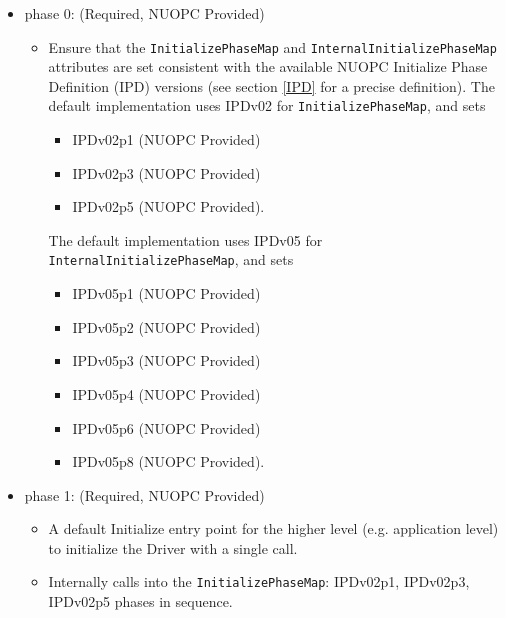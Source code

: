 \begin{itemize}
\item phase 0: ({\sc Required, NUOPC Provided})
  \begin{itemize}
  \item Ensure that the {\tt InitializePhaseMap} and {\tt InternalInitializePhaseMap} attributes are set consistent with the available NUOPC Initialize Phase Definition (IPD) versions (see section \ref{IPD} for a precise definition). The default implementation uses IPDv02 for {\tt InitializePhaseMap}, and sets
    \begin{itemize}
    \item IPDv02p1  ({\sc NUOPC Provided})
    \item IPDv02p3  ({\sc NUOPC Provided})
    \item IPDv02p5  ({\sc NUOPC Provided}).
    \end{itemize}  
 The default implementation uses IPDv05 for {\tt InternalInitializePhaseMap}, and sets
    \begin{itemize}
    \item IPDv05p1  ({\sc NUOPC Provided})
    \item IPDv05p2  ({\sc NUOPC Provided})
    \item IPDv05p3  ({\sc NUOPC Provided})
    \item IPDv05p4  ({\sc NUOPC Provided})
    \item IPDv05p6  ({\sc NUOPC Provided})
    \item IPDv05p8  ({\sc NUOPC Provided}).
    \end{itemize}    
  \end{itemize}  
\item phase 1: ({\sc Required, NUOPC Provided})
  \begin{itemize}
    \item A default Initialize entry point for the higher level (e.g. application level) to initialize the Driver with a single call.
    \item Internally calls into the  {\tt InitializePhaseMap}: IPDv02p1, IPDv02p3, IPDv02p5 phases in sequence.
  \end{itemize}  


\end{itemize}
